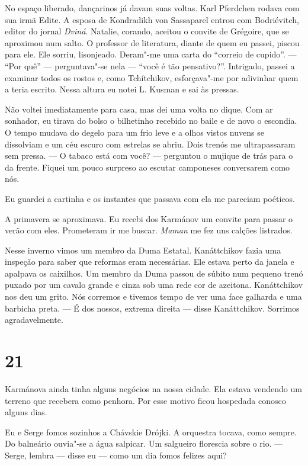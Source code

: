 No espaço liberado, dançarinos já davam suas voltas. Karl Pferdchen
rodava com sua irmã Edite. A esposa de Kondradikh von Sassaparel entrou
com Bodriévitch, editor do jornal \emph{Dviná}. Natalie, corando,
aceitou o convite de Grégoire, que se aproximou num salto. O professor
de literatura, diante de quem eu passei, piscou para ele. Ele sorriu,
lisonjeado. Deram"-me uma carta do ``correio de cupido''. --- ``Por quê''
--- perguntava"-se nela --- ``você é tão pensativo?''. Intrigado, passei
a examinar todos os rostos e, como Tchítchikov, esforçava"-me por
adivinhar quem a teria escrito. Nessa altura eu notei L. Kusman e sai às
pressas.

Não voltei imediatamente para casa, mas dei uma volta no dique. Com ar
sonhador, eu tirava do bolso o bilhetinho recebido no baile e de novo o
escondia. O tempo mudava do degelo para um frio leve e a olhos vistos
nuvens se dissolviam e um céu escuro com estrelas se abriu. Dois trenós
me ultrapassaram sem pressa. --- O tabaco está com você? --- perguntou o
mujique de trás para o da frente. Fiquei um pouco surpreso ao escutar
camponeses conversarem como nós.

Eu guardei a cartinha e os instantes que passava com ela me pareciam
poéticos.

A primavera se aproximava. Eu recebi dos Karmánov um convite para passar
o verão com eles. Prometeram ir me buscar. \emph{Maman} me fez uns
calções listrados.

Nesse inverno vimos um membro da Duma Estatal. Kanáttchikov fazia uma
inspeção para saber que reformas eram necessárias. Ele estava perto da
janela e apalpava os caixilhos. Um membro da Duma passou de súbito num
pequeno trenó puxado por um cavalo grande e cinza sob uma rede cor de
azeitona. Kanáttchikov nos deu um grito. Nós corremos e tivemos tempo de
ver uma face galharda e uma barbicha preta. --- É dos nossos, extrema
direita --- disse Kanáttchikov. Sorrimos agradavelmente.

\section{21}

Karmánova ainda tinha alguns negócios na nossa cidade. Ela estava
vendendo um terreno que recebera como penhora. Por esse motivo ficou
hospedada conosco alguns dias.

Eu e Serge fomos sozinhos a Chávskie Drójki. A orquestra tocava, como
sempre. Do balneário ouvia"-se a água salpicar. Um salgueiro florescia
sobre o rio. --- Serge, lembra --- disse eu --- como um dia fomos
felizes aqui?

